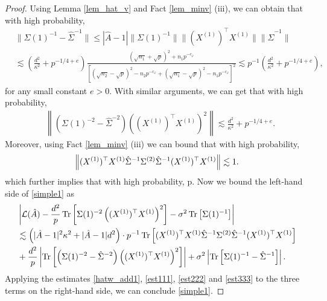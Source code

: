 \begin{proof}
Using Lemma \ref{lem_hat_v} and Fact \ref{lem_minv} (iii), we can obtain that with high probability,
\begin{align}
&\|\Sigma(1)^{-1}-\hat\Sigma^{-1}\| \le |\hat A-1|\|\Sigma(1)^{-1}\| \| (X^{(1)})^\top X^{(1)}\|\|\hat\Sigma^{-1}\| \label{est111}\\
&\lesssim \left(\frac{d^2}{\kappa^2} + p^{-1/4+e}\right)\frac{(\sqrt{n_1}+\sqrt{p})^{2}+n_1p^{-c_\varphi}}{ \left[(\sqrt{n_2}-\sqrt{p})^{2}-n_2p^{-c_\varphi}  + (\sqrt{n_1}-\sqrt{p})^{2}-n_1p^{-c_\varphi}\right]^2  }\lesssim p^{-1}\left(\frac{d^2}{\kappa^2} + p^{-1/4+e}\right),\nonumber
\end{align}
for any small constant $e>0$. With similar arguments, we can get that with high probability,
\begin{align}\label{est222}
&\left\|\left(\Sigma(1)^{-2}-\hat\Sigma^{-2}\right)\left((X^{(1)})^\top X^{(1)} \right)^2\right\| \lesssim  \frac{d^2}{\kappa^2} + p^{-1/4+e} .
\end{align}
Moreover, using Fact \ref{lem_minv} (iii) we can bound that with high probability,
$$\left\|  (X^{(1)})^{\top}X^{(1)} \hat\Sigma^{-1} \Sigma^{(2)} \hat\Sigma^{-1} (X^{(1)})^{\top}X^{(1)} \right\|\lesssim 1.$$
which further implies that with high probability,
\be\label{est333}\lesssim p.\ee
Now we bound the left-hand side of \eqref{simple1} as 
\begin{align*}
&\left|\mathcal L(\hat A)-\frac{d^2}{p}\operatorname{Tr}\left[\Sigma(1)^{-2} \left((X^{(1)})^\top X^{(1)} \right)^2\right] -\sigma^2  \operatorname{Tr}\left[\Sigma(1)^{-1}  \right]\right| \\
&\lesssim \left(|\hat A-1|^2 \kappa^2 + |\hat A-1|d^2\right)\cdot p^{-1}\operatorname{Tr}\left[ (X^{(1)})^{\top}X^{(1)} \hat\Sigma^{-1} \Sigma^{(2)} \hat\Sigma^{-1} (X^{(1)})^{\top}X^{(1)} \right] \\
&+ \frac{d^2}{p}\left|\operatorname{Tr}\left[\left(\Sigma(1)^{-2}-\hat\Sigma^{-2}\right) \left((X^{(1)})^\top X^{(1)} \right)^2\right]\right|+ \sigma^2  \left|\operatorname{Tr}\left[\Sigma(1)^{-1}-\hat\Sigma^{-1}  \right]\right|.
\end{align*}
Applying the estimates \eqref{hatw_add1}, \eqref{est111}, \eqref{est222} and \eqref{est333} to the three terms on the right-hand side, we can conclude \eqref{simple1}.

\end{proof}
